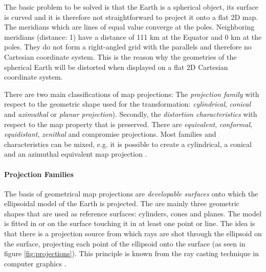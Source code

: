The basic problem to be solved is that the Earth is a spherical object, its surface is curved and it is therefore not straightforward to project it onto a flat 2D map. The meridians which are lines of equal value converge at the poles. Neighboring meridians (distance: 1\degree) have a distance of 111 km at the Equator and 0 km at the poles. They do not form a right-angled grid with the parallels and therefore no Cartesian coordinate system. This is the reason why the geometries of the spherical Earth will be distorted when displayed on a flat 2D Cartesian coordinate system. \cite[p.79]{bolstad2008gis}


There are two main classifications of map projections: The \emph{projection family} with respect to the geometric shape used for the transformation: \emph{cylindrical}, \emph{conical} and \emph{azimuthal} or \emph{planar projection}). Secondly, the \emph{distortion characteristics} with respect to the map property that is preserved. There are \emph{equivalent}, \emph{conformal}, \emph{equidistant}, \emph{zenithal} and compromise projections. Most families and characteristics can be mixed, e.g. it is possible to create a cylindrical, a conical and an azimuthal equivalent map projection
\cite{mapProjectionKrygier}.


\paragraph{Projection Families} %
\label{subp:projection_families}

The basis of geometrical map projections are \emph{developable surfaces} onto which the ellipsoidal model of the Earth is projected. The are mainly three geometric shapes that are used as reference surfaces: cylinders, cones and planes. The model is fitted in or on the surface touching it in at least one point or line. The idea is that there is a projection source from which rays are shot through the ellipsoid on the surface, projecting each point of the ellipsoid onto the surface (as seen in figure \ref{fig:projections}). This principle is known from the ray casting technique in computer graphics
\cite{mapProjectionGeokov}.

